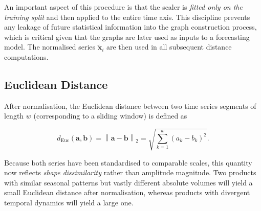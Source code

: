 An important aspect of this procedure is that the scaler is \textit{fitted only on the training split} and then applied to the entire time axis. This discipline prevents any leakage of future statistical information into the graph construction process, which is critical given that the graphs are later used as inputs to a forecasting model. The normalised series $\tilde{\mathbf{x}}_i$ are then used in all subsequent distance computations.

\subsection{Euclidean Distance}

After normalisation, the Euclidean distance between two time series segments of length $w$ (corresponding to a sliding window) is defined as

\begin{equation}
    d_{\text{Euc}}(\mathbf{a}, \mathbf{b}) = \left\| \mathbf{a} - \mathbf{b} \right\|_2 = \sqrt{\sum_{k=1}^{w} \left(a_k - b_k\right)^2}.
\end{equation}

Because both series have been standardised to comparable scales, this quantity now reflects \textit{shape dissimilarity} rather than amplitude magnitude. Two products with similar seasonal patterns but vastly different absolute volumes will yield a small Euclidean distance after normalisation, whereas products with divergent temporal dynamics will yield a large one.



